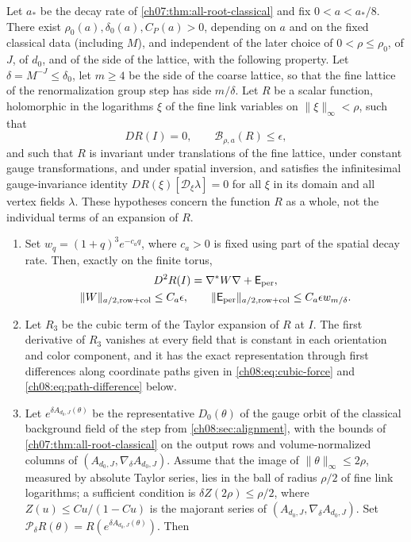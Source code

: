 \begin{theorem}\label{ch08:thm:principal-contraction}
Let $a_*$ be the decay rate of \cref{ch07:thm:all-root-classical} and fix $0<a<a_*/8$. There exist $\rho_0(a),\delta_0(a),C_P(a)>0$, depending on $a$ and on the fixed classical data (including $M$), and independent of the later choice of $0<\rho\le\rho_0$, of $J$, of $d_0$, and of the side of the lattice, with the following property. Let $\delta=M^{-J}\le\delta_0$, let $m\ge4$ be the side of the coarse lattice, so that the fine lattice of the renormalization group step has side $m/\delta$. Let $R$ be a scalar function, holomorphic in the logarithms $\xi$ of the fine link variables on $\|\xi\|_\infty<\rho$, such that
\[
 DR(I)=0,\qquad \mathcal B_{\rho,a}(R)\le\epsilon,
\]
and such that $R$ is invariant under translations of the fine lattice, under constant gauge transformations, and under spatial inversion, and satisfies the infinitesimal gauge-invariance identity $DR(\xi)[\mathcal D_\xi\lambda]=0$ for all $\xi$ in its domain and all vertex fields $\lambda$. These hypotheses concern the function $R$ as a whole, not the individual terms of an expansion of $R$.
\begin{enumerate}
\item Set $w_q=(1+q)^3e^{-c_aq}$, where $c_a>0$ is fixed using part of the spatial decay rate. Then, exactly on the finite torus,
\[
 \begin{gathered}
 D^2R(I)=\nabla^*W\nabla+\mathsf E_{\rm per},\\
 \|W\|_{a/2,\mathrm{row+col}}\le C_a\epsilon,\qquad
 \|\mathsf E_{\rm per}\|_{a/2,\mathrm{row+col}}
                                      \le C_a\epsilon w_{m/\delta}.
 \end{gathered}
\]
\item Let $R_3$ be the cubic term of the Taylor expansion of $R$ at $I$. The first derivative of $R_3$ vanishes at every field that is constant in each orientation and color component, and it has the exact representation through first differences along coordinate paths given in \eqref{ch08:eq:cubic-force} and \eqref{ch08:eq:path-difference} below.
\item Let $e^{\delta A_{d_0,J}(\theta)}$ be the representative $D_0(\theta)$ of the gauge orbit of the classical background field of the step from \cref{ch08:sec:alignment}, with the bounds of \cref{ch07:thm:all-root-classical} on the output rows and volume-normalized columns of $(A_{d_0,J},\nabla_\delta A_{d_0,J})$. Assume that the image of $\|\theta\|_\infty\le2\rho$, measured by absolute Taylor series, lies in the ball of radius $\rho/2$ of fine link logarithms; a sufficient condition is $\delta Z(2\rho)\le\rho/2$, where $Z(u)\le Cu/(1-Cu)$ is the majorant series of $(A_{d_0,J},\nabla_\delta A_{d_0,J})$. Set $\mathcal P_\delta R(\theta)=R(e^{\delta A_{d_0,J}(\theta)})$. Then

\end{enumerate}
\end{theorem}
